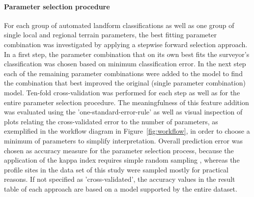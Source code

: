 \documentclass[preprint,12pt,authoryear]{elsarticle}
\begin{document}
\paragraph{Parameter selection procedure} For each group of automated landform classifications as well as one group of single local and regional terrain parameters, the best fitting parameter combination was investigated by applying a stepwise forward selection approach. In a first step, the parameter combination that on its own best fits the surveyor's classification was chosen based on minimum classification error. In the next step each of the remaining parameter combinations were added to the model to find the combination that best improved the original (single parameter combination) model. Ten-fold cross-validation was performed for each step as well as for the entire parameter selection procedure. The meaningfulness of this feature addition was evaluated using the 'one-standard-error-rule' \citep{James2013} as well as visual inspection of plots relating the cross-validated error to the number of parameters, as exemplified in the workflow diagram in Figure~\ref{fig:workflow}, in order to choose a minimum of parameters to simplify interpretation. Overall prediction error was chosen as accuracy measure for the parameter selection process, because the application of the kappa index requires simple random sampling \citep{Congalton1991}, whereas the profile sites in the data set of this study were sampled mostly for practical reasons. If not specified as 'cross-validated', the accuracy values in the result table of each approach are based on a model supported by the entire dataset. 
\end{document}
